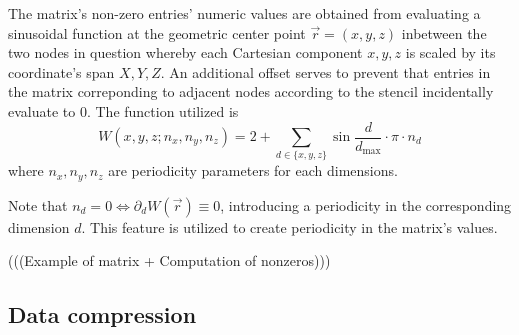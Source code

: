 \documentclass{article}
\begin{document}
    The matrix's non-zero entries' numeric values are obtained from evaluating a sinusoidal function at the geometric
    center point $\vec{r} = (x, y, z)$ inbetween the two nodes in question whereby each Cartesian component $x, y, z$ is
    scaled by its coordinate's span $X, Y, Z$. An additional offset serves to prevent that entries in the matrix
    correponding to adjacent nodes according to the stencil incidentally evaluate to 0. The function utilized is
    $$W(x,y,z; n_x, n_y, n_z) = 2 + \sum \limits_{d \in \{x,y,z\}} \sin{\frac{d}{d_{\text{max}}} \cdot \pi \cdot n_d} $$
    where $n_x, n_y, n_z$ are periodicity parameters for each dimensions.

    Note that $n_d = 0 \Leftrightarrow \partial_d W(\vec{r}) \equiv 0$, introducing a periodicity in the corresponding
    dimension $d$. This feature is utilized to create periodicity in the matrix's values.

    (((Example of matrix + Computation of nonzeros)))

  \subsection{Data compression}
\end{document}
